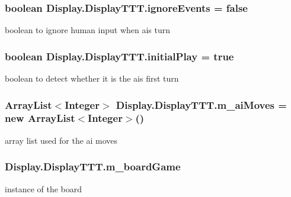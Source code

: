 \subsubsection[{ignore\+Events}]{\setlength{\rightskip}{0pt plus 5cm}boolean Display.\+Display\+T\+T\+T.\+ignore\+Events = false\hspace{0.3cm}{\ttfamily [private]}}\label{class_display_1_1_display_t_t_t_a713fdaab41d88af675c9f54dfcdb87a2}
boolean to ignore human input when ai\textquotesingle{}s turn \hypertarget{class_display_1_1_display_t_t_t_a7a6b9526f0a795edccb3911009d74842}{}
\subsubsection[{initial\+Play}]{\setlength{\rightskip}{0pt plus 5cm}boolean Display.\+Display\+T\+T\+T.\+initial\+Play = true\hspace{0.3cm}{\ttfamily [private]}}\label{class_display_1_1_display_t_t_t_a7a6b9526f0a795edccb3911009d74842}
boolean to detect whether it is the ai\textquotesingle{}s first turn \hypertarget{class_display_1_1_display_t_t_t_aaa3a8705876d9e60253f6c4599966ae9}{}
\subsubsection[{m\+\_\+ai\+Moves}]{\setlength{\rightskip}{0pt plus 5cm}Array\+List$<$Integer$>$ Display.\+Display\+T\+T\+T.\+m\+\_\+ai\+Moves = new Array\+List$<$Integer$>$()\hspace{0.3cm}{\ttfamily [private]}}\label{class_display_1_1_display_t_t_t_aaa3a8705876d9e60253f6c4599966ae9}
array list used for the ai moves \hypertarget{class_display_1_1_display_t_t_t_a3f540c3d30082e201fcb37c9623d6d27}{}
\subsubsection[{m\+\_\+board\+Game}]{ Display.\+Display\+T\+T\+T.\+m\+\_\+board\+Game\hspace{0.3cm}{\ttfamily [private]}}\label{class_display_1_1_display_t_t_t_a3f540c3d30082e201fcb37c9623d6d27}
instance of the board \hypertarget{class_display_1_1_display_t_t_t_a42c7a03ac93841369bd7e73460b59e11}{}
